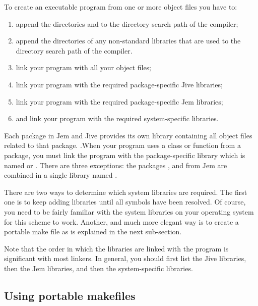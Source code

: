 To create an executable program from one or more object files you have
to:
\begin{enumerate}

\item append the directories  and
   to the directory search path of the
  compiler;

\item append the directories of any non-standard libraries that are used
  to the directory search path of the compiler.

\item link your program with all your object files;

\item link your program with the required package-specific Jive
  libraries;

\item link your program with the required package-specific Jem
  libraries;

\item and link your program with the required system-specific libraries.

\end{enumerate}
Each package in Jem and Jive provides its own library containing all
object files related to that package. .When your program uses a class or
function from a package, you must link the program with the
package-specific library which is named  or
. There are three exceptions: the packages
,  and  from Jem are combined in a single
library named .

There are two ways to determine which system libraries are required. The
first one is to keep adding libraries until all symbols have been
resolved. Of course, you need to be fairly familiar with the system
libraries on your operating system for this scheme to work. Another,
and much more elegant way is to create a portable make file as is
explained in the next sub-section.

Note that the order in which the libraries are linked with the program is
significant with most linkers. In general, you should first list the Jive
libraries, then the Jem libraries, and then the system-specific
libraries.


\subsection*{Using portable makefiles}

